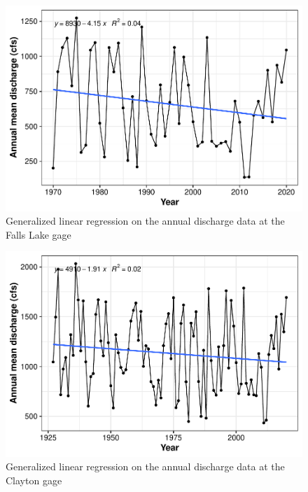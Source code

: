 \documentclass[
  12pt,
]{article}
\begin{document}
\begin{figure}

\includegraphics{Gardner_Zeng_pdf_output_files/figure-latex/GLM Falls Lake-1} \hfill{}

\caption{Generalized linear regression on the annual discharge data at the Falls Lake gage}\label{fig:GLM Falls Lake}
\end{figure}

\begin{figure}

\includegraphics{Gardner_Zeng_pdf_output_files/figure-latex/GLM Clayton-1} \hfill{}

\caption{Generalized linear regression on the annual discharge data at the Clayton gage}\label{fig:GLM Clayton}
\end{figure}
\end{document}
